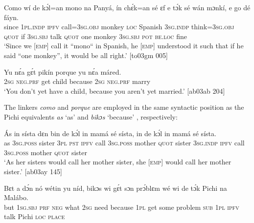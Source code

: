 \ea%
    \label{ex:key:1723}
    \gll Como  wí    de  kɔ́l=an    mono  na  Panyá,  ín    chɛ́k=an
sé    ɛf  e    tɔ́k  sé    wán  mɔnkí,  e    go  dé    fáyn.\\
since  \textsc{1pl.indp}  \textsc{ipfv}  call=\textsc{3sg.obj}  monkey  \textsc{loc}  Spanish  \textsc{3sg.indp}  think=\textsc{3sg.obj}
\textsc{quot}    if  \textsc{3sg.sbj}  talk  \textsc{quot}    one  monkey  \textsc{3sg.sbj}  \textsc{pot}  \textsc{be.loc}  fine\\

\glt ‘Since we \textsc{[emp]} call it “mono“ in Spanish, he \textsc{[emp]} understood it such 
that if he said “one monkey”, it would be all right.’ [to03gm 005]
\z


\ea%
    \label{ex:key:1724}
    \gll Yu  nɛ́a    gɛ́t  pikín  porque  yu  nɛ́a    máred.\\
\textsc{2sg}  \textsc{neg}.\textsc{prf}  get  child  because  \textsc{2sg}  \textsc{neg}.\textsc{prf}  marry\\

\glt ‘You don’t yet have a child, because you aren’t yet married.’ [ab03ab 204] 
\z

The linkers \textit{como} and \textit{porque} are employed in the same syntactic position as the Pichi equivalents \textit{as} ‘as’  and \textit{bikɔs} ‘because’ , respectively: 


\ea%
    \label{ex:key:1725}
    \gll \'{A}s  in    sísta    dɛn  bin  de  kɔ́l  in    mamá  sé
sísta,  in    de  kɔ́l  in    mamá  sé    sísta.\\
as  \textsc{3sg.poss}  sister  \textsc{3pl}  \textsc{pst}  \textsc{ipfv}  call  \textsc{3sg.poss}  mother  \textsc{quot}
sister  \textsc{3sg.indp}  \textsc{ipfv}  call  \textsc{3sg.poss}  mother  \textsc{quot}    sister\\

\glt ‘As her sisters would call her mother sister, she \textsc{[emp]} would 
call her mother sister.’ [ab03ay 145]
\z


\ea%
    \label{ex:key:1726}
    \gll Bɛt  a    dɔ́n  nó  wétin  yu  níd,    bikɔs  wi  gɛ́t  sɔn
prɔ́blɛm  wé  wi  de  tɔ́k  Pichi  na  Malábo.\\
but  \textsc{1sg.sbj}  \textsc{prf}  \textsc{neg}  what  \textsc{2sg}  need  because  \textsc{1pl}  get  some
problem  \textsc{sub}  \textsc{1pl}  \textsc{ipfv}  talk  Pichi  \textsc{loc}  \textsc{place}\\

